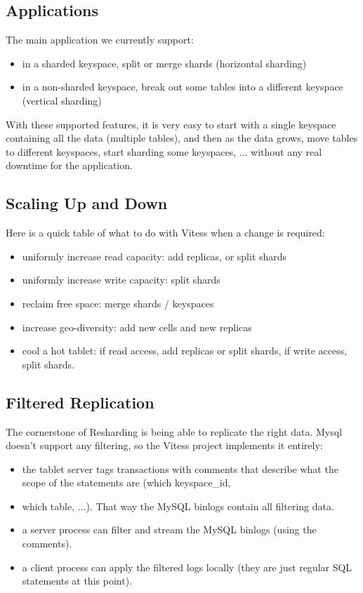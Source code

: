 \subsection{Applications}\label{applications}

The main application we currently support:


\begin{itemize}
\item in a sharded keyspace, split or merge shards (horizontal sharding)
\item in a non-sharded keyspace, break out some tables into a different keyspace (vertical sharding)
\end{itemize}

With these supported features, it is very easy to start with a single keyspace containing all the data (multiple tables),
and then as the data grows, move tables to different keyspaces, start sharding some keyspaces, ... without any real
downtime for the application.

\subsection{Scaling Up and Down}\hypertarget{scaling-up-and-down}{}\label{scaling-up-and-down}

Here is a quick table of what to do with Vitess when a change is required:

\begin{itemize}
\item uniformly increase read capacity: add replicas, or split shards
\item uniformly increase write capacity: split shards
\item reclaim free space: merge shards / keyspaces
\item increase geo-diversity: add new cells and new replicas
\item cool a hot tablet: if read access, add replicas or split shards, if write access, split shards.
\end{itemize}

\subsection{Filtered Replication}\hypertarget{filtered-replication}{}\label{filtered-replication}

The cornerstone of Resharding is being able to replicate the right data. Mysql doesn't support any filtering, so the
Vitess project implements it entirely:
\begin{itemize}
\item the tablet server tags transactions with comments that describe what the scope of the statements are (which keyspace\_id,
\item which table, ...). That way the MySQL binlogs contain all filtering data.
\item a server process can filter and stream the MySQL binlogs (using the comments).
\item a client process can apply the filtered logs locally (they are just regular SQL statements at this point).
\end{itemize}
